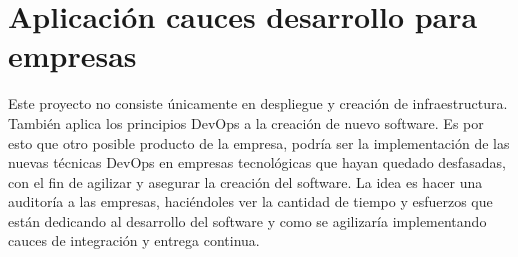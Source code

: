 \section{Aplicación cauces desarrollo para empresas}
\begin{text}
        Este proyecto no consiste únicamente en despliegue y creación de infraestructura. También aplica los principios DevOps a la creación de nuevo software. Es por esto que otro posible producto de la empresa, podría ser la implementación de las nuevas técnicas DevOps en empresas tecnológicas que hayan quedado desfasadas, con el fin de agilizar y asegurar la creación del software. La idea es hacer una auditoría a las empresas, haciéndoles ver la cantidad de tiempo y esfuerzos que están dedicando al desarrollo del software y como se agilizaría implementando cauces de integración y entrega continua.
\end{text}